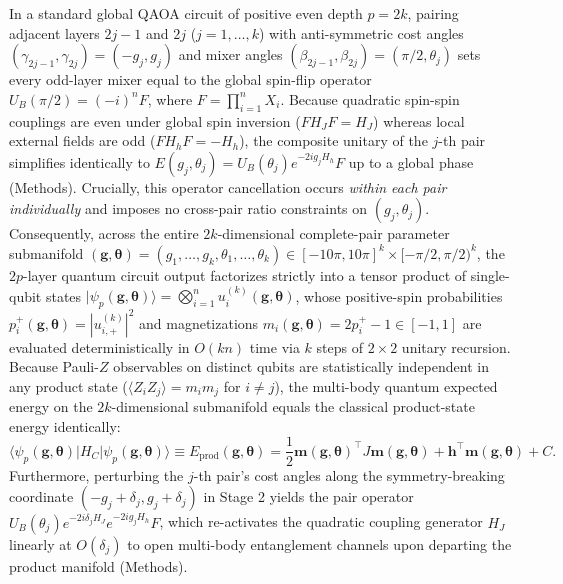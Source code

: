 \documentclass[10pt,a4paper]{article}
\begin{document}
In a standard global QAOA circuit of positive even depth $p = 2k$, pairing adjacent layers $2j-1$ and $2j$ ($j = 1, \ldots, k$) with anti-symmetric cost angles $(\gamma_{2j-1}, \gamma_{2j}) = (-g_j, g_j)$ and mixer angles $(\beta_{2j-1}, \beta_{2j}) = (\pi/2, \theta_j)$ sets every odd-layer mixer equal to the global spin-flip operator $U_B(\pi/2) = (-i)^n F$, where $F = \prod_{i=1}^n X_i$. Because quadratic spin-spin couplings are even under global spin inversion ($F H_J F = H_J$) whereas local external fields are odd ($F H_h F = -H_h$), the composite unitary of the $j$-th pair simplifies identically to $E(g_j, \theta_j) = U_B(\theta_j) e^{-2i g_j H_h} F$ up to a global phase \citep{yao2026echo} (Methods). Crucially, this operator cancellation occurs \emph{within each pair individually} and imposes no cross-pair ratio constraints on $(g_j, \theta_j)$. Consequently, across the entire $2k$-dimensional complete-pair parameter submanifold $(\boldsymbol{g}, \boldsymbol{\theta}) = (g_1, \ldots, g_k, \theta_1, \ldots, \theta_k) \in [-10\pi, 10\pi]^k \times [-\pi/2, \pi/2)^k$, the $2p$-layer quantum circuit output factorizes strictly into a tensor product of single-qubit states $|\psi_p(\boldsymbol{g}, \boldsymbol{\theta})\rangle = \bigotimes_{i=1}^n u_i^{(k)}(\boldsymbol{g}, \boldsymbol{\theta})$, whose positive-spin probabilities $p_i^+(\boldsymbol{g}, \boldsymbol{\theta}) = |u_{i,+}^{(k)}|^2$ and magnetizations $m_i(\boldsymbol{g}, \boldsymbol{\theta}) = 2p_i^+ - 1 \in [-1, 1]$ are evaluated deterministically in $O(kn)$ time via $k$ steps of $2\times 2$ unitary recursion. Because Pauli-$Z$ observables on distinct qubits are statistically independent in any product state ($\langle Z_i Z_j \rangle = m_i m_j$ for $i \ne j$), the multi-body quantum expected energy on the $2k$-dimensional submanifold equals the classical product-state energy identically:
\[
\langle\psi_p(\boldsymbol{g},\boldsymbol{\theta})|H_C|\psi_p(\boldsymbol{g},\boldsymbol{\theta})\rangle \equiv E_{\mathrm{prod}}(\boldsymbol{g},\boldsymbol{\theta}) = \frac{1}{2}\boldsymbol{m}(\boldsymbol{g},\boldsymbol{\theta})^\top J\boldsymbol{m}(\boldsymbol{g},\boldsymbol{\theta}) + \boldsymbol{h}^\top\boldsymbol{m}(\boldsymbol{g},\boldsymbol{\theta}) + C.
\]
Furthermore, perturbing the $j$-th pair's cost angles along the symmetry-breaking coordinate $(-g_j + \delta_j, g_j + \delta_j)$ in Stage 2 yields the pair operator $U_B(\theta_j) e^{-2i\delta_j H_J} e^{-2i g_j H_h} F$, which re-activates the quadratic coupling generator $H_J$ linearly at $O(\delta_j)$ to open multi-body entanglement channels upon departing the product manifold (Methods).
\end{document}

